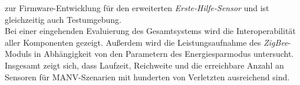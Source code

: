 \begin{small}
zur Firmware-Entwicklung für den erweiterten \emph{Erste-Hilfe-Sensor} und ist gleichzeitig auch Testumgebung.
\\
Bei einer eingehenden Evaluierung des Gesamtsystems wird die Interoperabilität aller Komponenten gezeigt. 
Außerdem wird die Leistungsaufnahme des \emph{ZigBee}-Moduls in Abhängigkeit von den Parametern des 
Energiesparmodus untersucht. Insgesamt zeigt sich, dass Laufzeit, Reichweite und die erreichbare Anzahl an 
Sensoren für MANV-Szenarien mit hunderten von Verletzten ausreichend sind.
\end{small}
